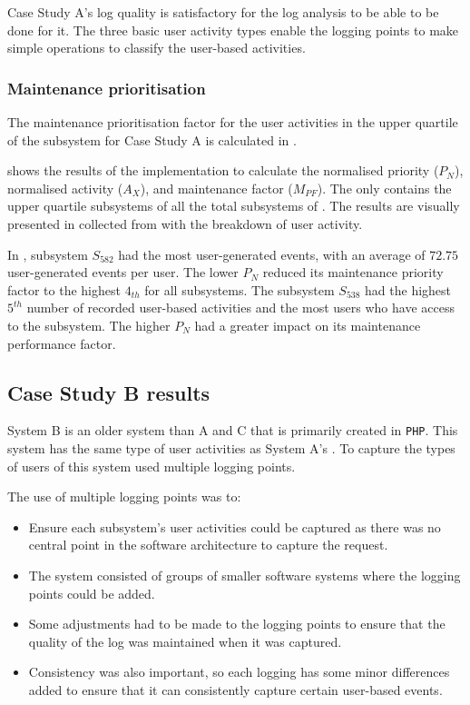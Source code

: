 Case Study A's log quality is satisfactory for the log analysis to be able to be done for it. The three basic user activity types enable the logging points to make simple operations to classify the user-based activities. 

\subsubsection{Maintenance prioritisation}
The maintenance prioritisation factor for the user activities in the upper quartile of the subsystem for Case Study A is calculated in .



 shows the results of the implementation  to calculate the normalised priority ($P_N$), normalised activity ($A_X$), and maintenance factor ($M_{PF}$). The  only contains the upper quartile subsystems of all the total subsystems of . The results are visually presented in  collected from  with the breakdown of user activity. \par In , subsystem $S_{582}$ had the most user-generated events, with an average of $72.75$ user-generated events per user. The lower $P_N$ reduced its maintenance priority factor to the highest $4_{th}$ for all subsystems. The subsystem $S_{538}$ had the highest $5^{th}$ number of recorded user-based activities and the most users who have access to the subsystem. The higher $P_N$ had a greater impact on its maintenance performance factor. 

\subsection{Case Study B results}\label{sec:ch3_csB}
System B is an older system than A and C that is primarily created in \texttt{PHP}. This system has the same type of user activities as System A's . To capture the types of users of  this system used multiple logging points.\par The use of multiple logging points was to:

\begin{itemize}
	\item Ensure each subsystem's user activities could be captured as there was no central point in the software architecture to capture the request. 
	\item The system consisted of groups of smaller software systems where the logging points could be added.
	\item Some adjustments had to be made to the logging points to ensure that the quality of the log was maintained when it was captured. 
	\item Consistency was also important, so each logging has some minor differences added to ensure that it can consistently capture certain user-based events. \
\end{itemize}

